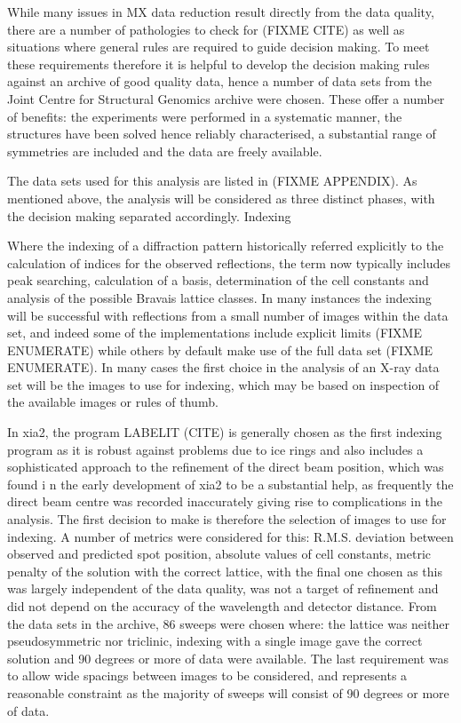 While many issues in MX data reduction result directly from the data quality, there are a number of pathologies to check for (FIXME CITE) as well as situations where general rules are required to guide decision making. To meet these requirements therefore it is helpful to develop the decision making rules against an archive of good quality data, hence a number of data sets from the Joint Centre for Structural Genomics archive were chosen. These offer a number of benefits:
the experiments were performed in a systematic manner,
the structures have been solved hence reliably characterised,
a substantial range of symmetries are included and
the data are freely available.


The data sets used for this analysis are listed in (FIXME APPENDIX). As mentioned above, the analysis will be considered as three distinct phases, with the decision making separated accordingly.
Indexing

Where the indexing of a diffraction pattern historically referred explicitly to the calculation of indices for the observed reflections, the term now typically includes peak searching, calculation of a basis, determination of the cell constants and analysis of the possible Bravais lattice classes. In many instances the indexing will be successful with reflections from a small number of images within the data set, and indeed some of the implementations include explicit limits (FIXME ENUMERATE) while others by default make use of the full data set (FIXME ENUMERATE). In many cases the first choice in the analysis of an X-ray data set will be the images to use for indexing, which may be based on inspection of the available images or rules of thumb. 

In xia2, the program LABELIT (CITE) is generally chosen as the first indexing program as it is robust against problems due to ice rings and also includes a sophisticated approach to the refinement of the direct beam position, which was found i n the early development of xia2 to be a substantial help, as frequently the direct beam centre was recorded inaccurately giving rise to complications in the analysis. The first decision to make is therefore the selection of images to use for indexing. A number of metrics were considered for this: R.M.S. deviation between observed and predicted spot position, absolute values of cell constants, metric penalty of the solution with the correct lattice, with the final one chosen as this was largely independent of the data quality, was not a target of refinement and did not depend on the accuracy of the wavelength and detector distance. From the data sets in the archive, 86 sweeps were chosen where: the lattice was neither pseudosymmetric nor triclinic, indexing with a single image gave the correct solution and 90 degrees or more of data were available. The last requirement was to allow wide spacings between images to be considered, and represents a reasonable constraint as the majority of sweeps will consist of 90 degrees or more of data. 

